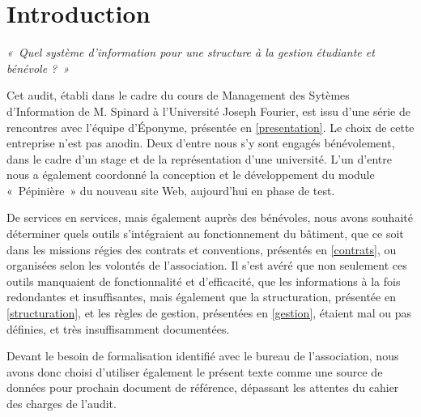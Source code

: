 \section*{Introduction}

\textit{«~Quel système d'information pour une structure à la gestion
étudiante et bénévole ?~»}

Cet audit, établi dans le cadre du cours de Management des Sytèmes
d'Information de M. Spinard à l'Université Joseph Fourier, est issu d'une série
de rencontres avec l'équipe d'Éponyme, présentée en \ref{presentation}.
Le choix de cette entreprise n'est pas anodin. Deux d'entre nous s'y sont
engagés bénévolement, dans le cadre d'un stage et de la représentation d'une
université. L'un d'entre nous a également coordonné la conception et le
développement du module «~Pépinière~» du nouveau site Web, aujourd'hui en phase
de test.

De services en services, mais également auprès des bénévoles, nous
avons souhaité déterminer quels outils s'intégraient au fonctionnement du
bâtiment, que ce soit dans les missions régies des contrats et conventions,
présentés en \ref{contrats}, ou organisées selon les volontés de l'association.
Il s'est avéré que non seulement ces outils manquaient de fonctionnalité et
d'efficacité, que les informations à la fois redondantes et insuffisantes,
mais également que la structuration, présentée en \ref{structuration}, et les
règles de gestion, présentées en \ref{gestion}, étaient mal ou pas définies,
et très insuffisamment documentées.

Devant le besoin de formalisation identifié avec le bureau de l'association,
nous avons donc choisi d'utiliser également le présent texte comme une source
de données pour prochain document de référence, dépassant les attentes du
cahier des charges de l'audit.
